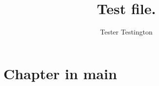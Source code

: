 \documentclass{book}
\title{Test file.}
\author{Tester Testington}
\begin{document}
\maketitle

\chapter{Chapter in main}



\end{document}
